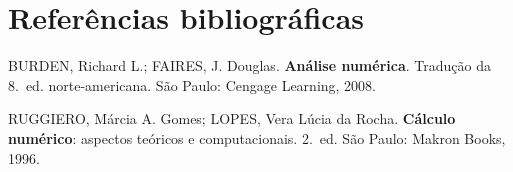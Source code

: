 \backmatter
\chapter*{Referências bibliográficas}

\begin{list}{}{\setlength{\leftmargin}{0pt}\setlength{\itemindent}{0pt}\setlength{\itemsep}{1.2em}\setlength{\parsep}{0pt}}
\raggedright
\item BURDEN, Richard L.; FAIRES, J. Douglas. \textbf{Análise numérica}. Tradução da 8.~ed. norte-americana.
  São Paulo: Cengage Learning, 2008.

\item RUGGIERO, Márcia A. Gomes; LOPES, Vera Lúcia da Rocha. \textbf{Cálculo numérico}: aspectos teóricos e
  computacionais. 2.~ed. São Paulo: Makron Books, 1996.
\end{list}
